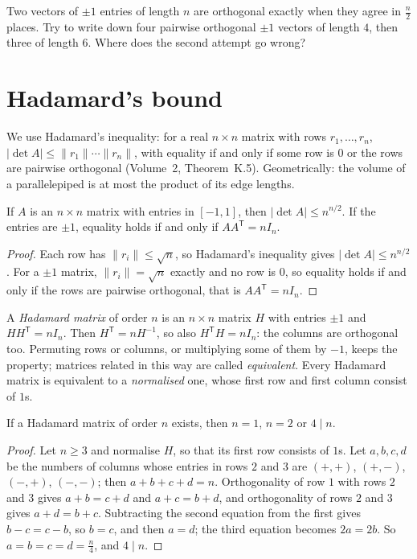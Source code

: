 \begin{think}
Two vectors of $\pm1$ entries of length $n$ are orthogonal exactly when they agree in $\frac n2$ places. Try to write down four pairwise orthogonal
$\pm1$ vectors of length $4$, then three of length $6$. Where does the second attempt go wrong?
\end{think}

\section{Hadamard's bound}

We use Hadamard's inequality: for a real $n\times n$ matrix with rows $r_1,\dots,r_n$, $|\det A|\le\|r_1\|\cdots\|r_n\|$, with equality if and only if
some row is $0$ or the rows are pairwise orthogonal (Volume~2, Theorem~K.5). Geometrically: the volume of a parallelepiped is at most the product of its
edge lengths.

\begin{theorem}[Hadamard, 1893]\label{conjectures:thm:hadbound}
If $A$ is an $n\times n$ matrix with entries in $[-1,1]$, then $|\det A|\le n^{n/2}$. If the entries are $\pm1$, equality holds if and only if
$AA^{\mathsf T}=nI_n$.
\end{theorem}
\begin{proof}
Each row has $\|r_i\|\le\sqrt n$, so Hadamard's inequality gives $|\det A|\le n^{n/2}$. For a $\pm1$ matrix, $\|r_i\|=\sqrt n$ exactly and no row is $0$,
so equality holds if and only if the rows are pairwise orthogonal, that is $AA^{\mathsf T}=nI_n$.
\end{proof}

A \emph{Hadamard matrix} of order $n$ is an $n\times n$ matrix $H$ with entries $\pm1$ and $HH^{\mathsf T}=nI_n$. Then $H^{\mathsf T}=nH^{-1}$, so also
$H^{\mathsf T}H=nI_n$: the columns are orthogonal too. Permuting rows or columns, or multiplying some of them by $-1$, keeps the property; matrices related
in this way are called \emph{equivalent}. Every Hadamard matrix is equivalent to a \emph{normalised} one, whose first row and first column consist of $1$s.

\begin{proposition}\label{conjectures:prop:div4}
If a Hadamard matrix of order $n$ exists, then $n=1$, $n=2$ or $4\mid n$.
\end{proposition}
\begin{proof}
Let $n\ge3$ and normalise $H$, so that its first row consists of $1$s. Let $a,b,c,d$ be the numbers of columns whose entries in rows $2$ and $3$ are
$(+,+)$, $(+,-)$, $(-,+)$, $(-,-)$; then $a+b+c+d=n$. Orthogonality of row $1$ with rows $2$ and $3$ gives $a+b=c+d$ and $a+c=b+d$, and orthogonality
of rows $2$ and $3$ gives $a+d=b+c$. Subtracting the second equation from the first gives $b-c=c-b$, so $b=c$, and then $a=d$; the third equation
becomes $2a=2b$. So $a=b=c=d=\frac n4$, and $4\mid n$.
\end{proof}

